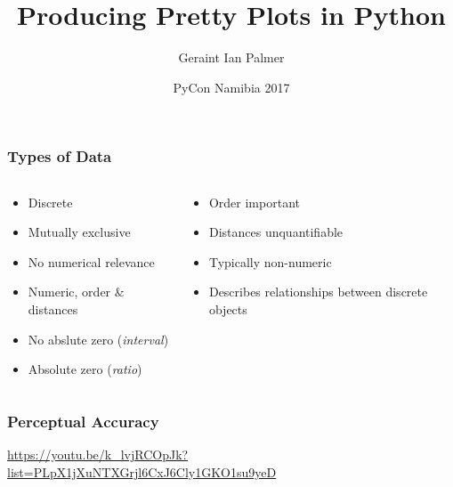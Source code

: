 \documentclass{beamer}
\title
{Producing Pretty Plots in Python}
\author{Geraint Ian Palmer}
\date{PyCon Namibia 2017}
\begin{document}
\frame{\titlepage}

\begin{frame}
\frametitle{Types of Data}
\begin{columns}
\begin{column}{0.5\textwidth}
\begin{center}

\small{
\begin{itemize}
\setlength\itemsep{-0.2em}
\item Discrete
\item Mutually exclusive
\item No numerical relevance
\end{itemize}
}
\vspace{8mm}

\small{
\begin{itemize}
\setlength\itemsep{-0.2em}
\item Numeric, order \& distances
\item No abslute zero (\textit{interval})
\item Absolute zero (\textit{ratio})
\end{itemize}
}
\end{center}
\end{column}
\begin{column}{0.5\textwidth}
\begin{center}

\small{
\begin{itemize}
\setlength\itemsep{-0.2em}
\item Order important
\item Distances unquantifiable
\item Typically non-numeric
\end{itemize}
}
\vspace{8mm}

\small{
\begin{itemize}
\setlength\itemsep{-0.2em}
\item Describes relationships between discrete objects
\end{itemize}
}
\end{center}
\end{column}
\end{columns}
\end{frame}

\begin{frame}
\frametitle{Perceptual Accuracy}

\tiny{\url{https://youtu.be/k_lvjRCOpJk?list=PLpX1jXuNTXGrjl6CxJ6Cly1GKO1su9yeD}}
\end{frame}
\end{document}
